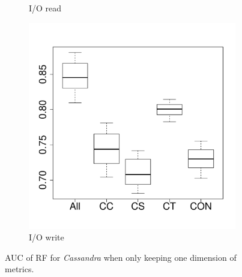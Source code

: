 \begin{figure}[t]
\begin{subfigure}{0.19\textwidth}
                \caption{I/O read}
        \end{subfigure}
        \begin{subfigure}{0.19\textwidth}
                \includegraphics[width=\linewidth]{Figures/iowrite-cassandrakeep-importance.pdf}
                \caption{I/O write}
        \end{subfigure}
        
	\caption{AUC of RF for \emph{Cassandra} when only keeping one dimension of metrics.}
	\label{fig:importance-dimenssion-keep-cassandra}
\end{figure}

